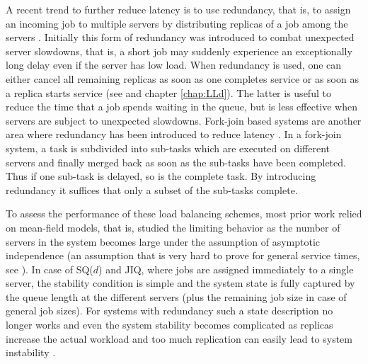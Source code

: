 \documentclass[12pt]{report}
\begin{document}
A recent trend to further reduce latency is to use redundancy, 
that is, to assign an incoming job to multiple servers by 
distributing replicas of a job among the servers  \cite{Ananthanarayanan13}. 
Initially this form of redundancy was introduced to combat unexpected server slowdowns,
that is, a short job may suddenly experience an exceptionally long delay even if
the server has low load.
When redundancy is used, one can either cancel all remaining replicas as soon as one completes service \cite{gardnerOR} or as soon as a replica starts service (see \cite{Ayesta18} and chapter \ref{chap:LLd}).
The latter is useful to reduce the time that a job spends waiting in the queue,
but is less effective when servers are subject to unexpected slowdowns. 
Fork-join based systems are another area where redundancy has been introduced to
reduce latency \cite{Joshi12,Shah16,Joshi17}. In a fork-join system, a task is subdivided
into sub-tasks which are executed on different servers and finally merged back as soon as
the sub-tasks have been completed. Thus if one sub-task is delayed, so is the complete task.
By introducing redundancy it suffices that only a subset of the sub-tasks complete.

To assess the performance of these load balancing schemes, most prior work relied on mean-field
models, that is, studied the limiting behavior as the number of servers
in the system becomes large under the assumption of asymptotic independence
(an assumption that is very hard to prove for
general service times, see \cite{bramson2012asymptotic}). 
In case of SQ($d$) and JIQ, where jobs are assigned immediately to a single server,
the stability condition is simple and the system state is fully captured by the
queue length at the different servers (plus the remaining job size in case of
general job sizes). For systems with redundancy such a state description no longer
works and even the system stability becomes complicated as replicas increase the
actual workload and too much replication can easily lead to system instability \cite{Shah16}.  
\end{document}
